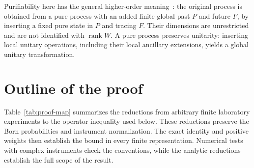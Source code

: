 \documentclass[11pt]{article}
\begin{document}
Purifiability here has the general higher-order meaning~\cite{purif}: the original process is obtained from a pure process with an added finite global past $P$ and future $F$, by inserting a fixed pure state in $P$ and tracing $F$. Their dimensions are unrestricted and are not identified with $\operatorname{rank}W$. A pure process preserves unitarity: inserting local unitary operations, including their local ancillary extensions, yields a global unitary transformation.

\section{Outline of the proof}
\label{sec:proof-map}
Table~\ref{tab:proof-map} summarizes the reductions from arbitrary finite laboratory experiments to the operator inequality used below. These reductions preserve the Born probabilities and instrument normalization. The exact identity and positive weights then establish the bound in every finite representation. Numerical tests with complex instruments check the conventions, while the analytic reductions establish the full scope of the result.
\end{document}
